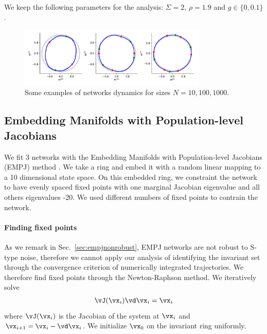 \documentclass{article} %
\newcommand{\ascomment}[1]{\textcolor{ascolor}{(#1)}}
\newcounter{ct}
\theoremstyle{definition}
\theoremstyle{remark}
\begin{document}
We keep the following parameters for the analysis:
\(\Sigma=2\),
\(\rho=1.9\) and
\(g\in\{0, 0.1\}\).


\begin{figure}[h]
\centering
\includegraphics[width=0.8\textwidth]{N100_si2_rho1.9_g0_fp4.8.12}
\caption{Some examples of networks dynamics for sizes \(N=10,100,1000\).}\label{fig:low_rank_examples}
\end{figure}





\subsection{Embedding Manifolds with Population-level Jacobians}\label{sec:supp:empj}
We fit 3 networks with the Embedding Manifolds with Population-level Jacobians (EMPJ) method \citep{pollock2020}.
We take a ring and embed it with a random linear mapping to a 10 dimensional state space.
On this embedded ring, we constraint the network to have evenly spaced fixed points with one marginal Jacobian eigenvalue and all others eigenvalues -20.
We used different numbers of fixed points to contrain the network.

%

\paragraph{Finding fixed points}
As we remark in Sec.~\ref{sec:empjnonrobust}, EMPJ networks are not robust to S-type noise, therefore we cannot apply our analysis of identifying the invariant set through the convergence criterion of numerically integrated trajectories.
We therefore find fixed points through the Newton-Raphson method.
We iteratively solve
\begin{align}
 \vJ(\vx_i)\vd\vx_i = \vx_i
\end{align}
where \(\vJ(\vx_i)\) is the Jacobian of the system at \(\vx_i\) and \(\vx_{i+1}=\vx_i-\vd\vx_i\).
We initialize \(\vx_0\) on the invariant ring uniformly.
\end{document}
